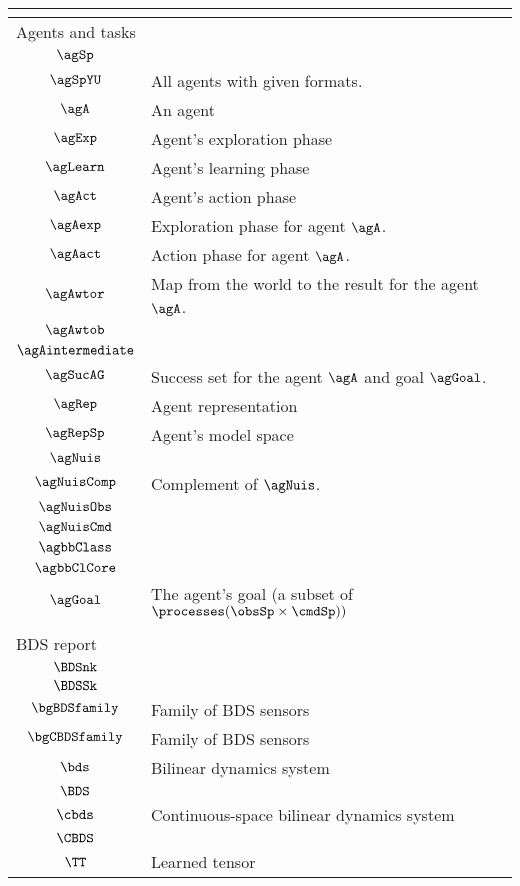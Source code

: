 \begin{longtable}{cl}
\multicolumn{2}{l}{}\\ 
 \hline
\hline
\multicolumn{2}{l}{Agents and tasks}\\ 
 \hline
$\agSp$ &  \\ 
 $\agSpYU$ &  All agents with given formats.\\ 
 $\agA$ &  An agent\\ 
 $\agExp$ &  Agent's exploration phase\\ 
 $\agLearn$ &  Agent's learning phase\\ 
 $\agAct$ &  Agent's action phase\\ 
 $\agAexp$ &  Exploration phase for agent $\agA$.\\ 
 $\agAact$ &   Action phase for agent $\agA$.\\ 
 $\agAwtor$ &  Map from the world to the result for the agent $\agA$.\\ 
 $\agAwtob$ &  \\ 
 $\agAintermediate$ & \\ 
 $\agSucAG$ &  Success set for the agent $\agA$ and goal $\agGoal$.\\ 
 $\agRep$ &  Agent representation\\ 
 $\agRepSp$ &  Agent's model space\\ 
 $\agNuis$ & \\ 
 $\agNuisComp$ &  Complement of $\agNuis$.\\ 
 $\agNuisObs$ & \\ 
 $\agNuisCmd$ & \\ 
 $\agbbClass$ & \\ 
 $\agbbClCore$ & \\ 
 $\agGoal$ &  The agent's goal (a subset of $\processes(\obsSp\times\cmdSp))$\\ 
 \multicolumn{2}{l}{}\\ 
 \hline
\hline
\multicolumn{2}{l}{BDS report}\\ 
 \hline
$\BDSnk$ & \\ 
 $\BDSSk$ & \\ 
 $\bgBDSfamily$ &  Family of BDS sensors\\ 
 $\bgCBDSfamily$ &  Family of BDS sensors\\ 
 $\bds$ &  Bilinear dynamics system\\ 
 $\BDS$ & \\ 
 $\cbds$ &  Continuous-space bilinear dynamics system\\ 
 $\CBDS$ & \\ 
 $\TT$ &  Learned tensor\\ 

\end{longtable}
